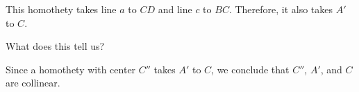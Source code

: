 


This homothety takes line $a$ to $CD$ and line $c$ to $BC$. Therefore, it also takes $A'$ to $C$.

What does this tell us?









Since a homothety with center $C''$ takes $A'$ to $C$, we conclude that $C''$, $A'$, and $C$ are collinear.




